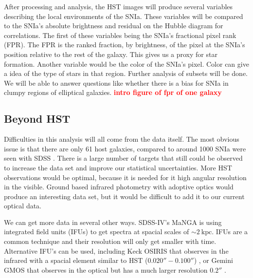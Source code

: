 \documentclass[apj, iop]{emulateapj}
\newcommand{\sn}{SNIa}
\newcommand{\todo}[1]{\textbf{\textcolor{red}{#1}}}
\begin{document}
After processing and analysis, the HST images will produce several variables
describing the local environments of the \sn{}. These variables will be compared
to the \sn{}'s absolute brightness and residual on the Hubble diagram for
correlations. The first of these variables being the \sn{}'s fractional pixel
rank (FPR). The FPR is the ranked fraction, by brightness, of the pixel at the
\sn{}'s position relative to the rest of the galaxy. This gives us a proxy for
star formation. Another variable would be the color of the \sn{}'s pixel. Color
can give a idea of the type of stars in that region. Further analysis of subsets
will be done. We will be able to answer questions like whether there is a bias
for \sn{} in clumpy regions of elliptical galaxies.
\todo{intro figure of fpr of one galaxy}


\subsection{Beyond HST}\label{beyond-hst}

Difficulties in this analysis will all come from the data itself. The most
obvious issue is that there are only 61 host galaxies, compared to around 1000
\sn{} were seen with SDSS \citep{Campbell13}. There is a large number of targets
that still could be observed to increase the data set and improve our
statistical uncertainties. More HST observations would be optimal, because it is
needed for it high angular resolution in the visible. Ground based infrared
photometry with adoptive optics would produce an interesting data set, but it
would be difficult to add it to our current optical data.

We can get more data in several other ways. SDSS-IV's MaNGA is using integrated
field units (IFUs) to get spectra at spacial scales of $\sim 2 ~\text{kpc}$.
IFUs are a common technique and their resolution will only get smaller with
time. Alternative IFU's can be used, including Keck OSIRIS that observes in the
infrared with a spacial element similar to HST ($0.020'' - 0.100''$)
\citep{OSIRIS},
or Gemini GMOS that observes in the optical but has a much larger resolution
$0.2''$ \citep{Gemini}.
\end{document}
